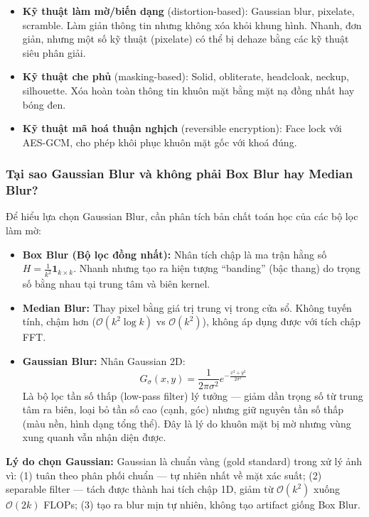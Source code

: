\begin{itemize}
    \item \textbf{Kỹ thuật làm mờ/biến dạng} (distortion-based): Gaussian blur, pixelate, scramble. Làm giản thông tin nhưng không xóa khỏi khung hình. Nhanh, đơn giản, nhưng một số kỹ thuật (pixelate) có thể bị dehaze bằng các kỹ thuật siêu phân giải.
    \item \textbf{Kỹ thuật che phủ} (masking-based): Solid, obliterate, headcloak, neckup, silhouette. Xóa hoàn toàn thông tin khuôn mặt bằng mặt nạ đồng nhất hay bóng đen.
    \item \textbf{Kỹ thuật mã hoá thuận nghịch} (reversible encryption): Face lock với AES-GCM, cho phép khôi phục khuôn mặt gốc với khoá đúng.
\end{itemize}

\subsubsection{Tại sao Gaussian Blur và không phải Box Blur hay Median Blur?}
\label{subsubsec:whygaussian}

Để hiểu lựa chọn Gaussian Blur, cần phân tích bản chất toán học của các bộ lọc làm mờ:

\begin{itemize}
    \item \textbf{Box Blur (Bộ lọc đồng nhất):} Nhân tích chập là ma trận hằng số $H = \frac{1}{k^2}\mathbf{1}_{k \times k}$. Nhanh nhưng tạo ra hiện tượng ``banding'' (bậc thang) do trọng số bằng nhau tại trung tâm và biên kernel.
    
    \item \textbf{Median Blur:} Thay pixel bằng giá trị trung vị trong cửa sổ. Không tuyến tính, chậm hơn ($\mathcal{O}(k^2 \log k)$ vs $\mathcal{O}(k^2)$), không áp dụng được với tích chập FFT. 
    
    \item \textbf{Gaussian Blur:} Nhân Gaussian 2D:
    \begin{equation}
        G_\sigma(x,y) = \frac{1}{2\pi\sigma^2} e^{-\frac{x^2+y^2}{2\sigma^2}}
    \end{equation}
    Là bộ lọc tần số thấp (low-pass filter) lý tưởng --- giảm dần trọng số từ trung tâm ra biên, loại bỏ tần số cao (cạnh, góc) nhưng giữ nguyên tần số thấp (màu nền, hình dạng tổng thể). Đây là lý do khuôn mặt bị mờ nhưng vùng xung quanh vẫn nhận diện được.
\end{itemize}

\textbf{Lý do chọn Gaussian:} Gaussian là chuẩn vàng (gold standard) trong xử lý ảnh vì: (1) tuân theo phân phối chuẩn --- tự nhiên nhất về mặt xác suất; (2) separable filter --- tách được thành hai tích chập 1D, giảm từ $\mathcal{O}(k^2)$ xuống $\mathcal{O}(2k)$ FLOPs; (3) tạo ra blur mịn tự nhiên, không tạo artifact giống Box Blur.

